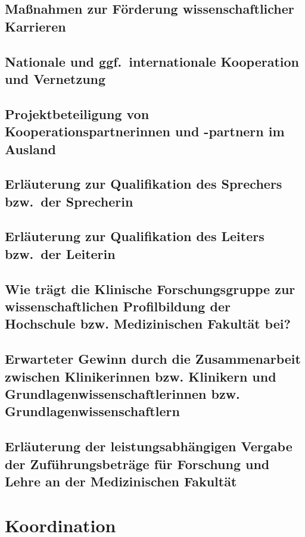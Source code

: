 \documentclass{scrartcl}
\begin{document}
\subsection{Maßnahmen zur Förderung wissenschaftlicher Karrieren}

\subsection{Nationale und ggf.\ internationale Kooperation und Vernetzung}

\subsection{Projektbeteiligung von Kooperationspartnerinnen und -partnern im Ausland}

\subsection{Erläuterung zur Qualifikation des Sprechers bzw.\ der Sprecherin}

\subsection{Erläuterung zur Qualifikation des Leiters bzw.\ der Leiterin}

\subsection{Wie trägt die Klinische Forschungsgruppe zur wissenschaftlichen Profilbildung der Hochschule bzw. Medizinischen Fakultät bei?}

\subsection{Erwarteter Gewinn durch die Zusammenarbeit zwischen Klinikerinnen bzw. Klinikern und Grundlagenwissenschaftlerinnen bzw. Grundlagenwissenschaftlern}

\subsection{Erläuterung der leistungsabhängigen Vergabe der Zuführungsbeträge für Forschung und Lehre an der Medizinischen Fakultät}


\section{Koordination}
\end{document}
